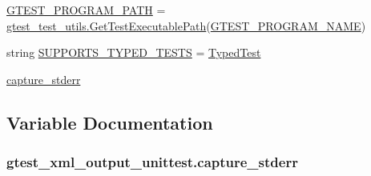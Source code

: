 \begin{DoxyCompactItemize}
\item 
\hyperlink{namespacegtest__xml__output__unittest_a8c4cf6e9b6a184278a1b2759e5eaec6b}{G\+T\+E\+S\+T\+\_\+\+P\+R\+O\+G\+R\+A\+M\+\_\+\+P\+A\+TH} = \hyperlink{namespacegtest__test__utils_a89ed3717984a80ffbb7a9c92f71b86a2}{gtest\+\_\+test\+\_\+utils.\+Get\+Test\+Executable\+Path}(\hyperlink{namespacegtest__xml__output__unittest_ab89cc5b402310ef67bcaf38fa5017461}{G\+T\+E\+S\+T\+\_\+\+P\+R\+O\+G\+R\+A\+M\+\_\+\+N\+A\+ME})
\item 
string \hyperlink{namespacegtest__xml__output__unittest_a07eecd027d660022c0ab447f3c3e0f2e}{S\+U\+P\+P\+O\+R\+T\+S\+\_\+\+T\+Y\+P\+E\+D\+\_\+\+T\+E\+S\+TS} = \textquotesingle{}\hyperlink{class_typed_test}{Typed\+Test}\textquotesingle{}
\item 
\hyperlink{namespacegtest__xml__output__unittest_a143c9ca62f439947dde9eb76bfe243e3}{capture\+\_\+stderr}
\end{DoxyCompactItemize}


\subsection{Variable Documentation}
\subsubsection[{\texorpdfstring{capture\+\_\+stderr}{capture_stderr}}]{\setlength{\rightskip}{0pt plus 5cm}gtest\+\_\+xml\+\_\+output\+\_\+unittest.\+capture\+\_\+stderr}\hypertarget{namespacegtest__xml__output__unittest_a143c9ca62f439947dde9eb76bfe243e3}{}\label{namespacegtest__xml__output__unittest_a143c9ca62f439947dde9eb76bfe243e3}
